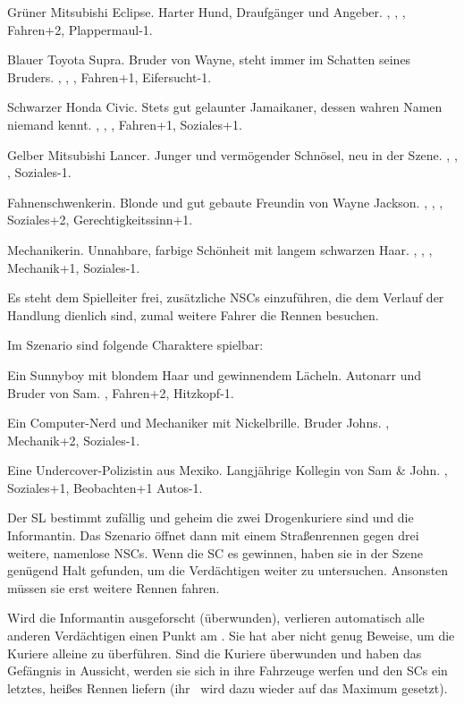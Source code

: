 {		 Grüner Mitsubishi Eclipse. Harter Hund, Draufgänger und Angeber. , , , Fahren+2, Plappermaul-1.

		 Blauer Toyota Supra. Bruder von Wayne, steht immer im Schatten seines Bruders. , , , Fahren+1, Eifersucht-1.

		 Schwarzer Honda Civic. Stets gut gelaunter Jamaikaner, dessen wahren Namen niemand kennt. , , , Fahren+1, Soziales+1.

		 Gelber Mitsubishi Lancer. Junger und vermögender Schnösel, neu in der Szene. , , , Soziales-1.

		 Fahnenschwenkerin. Blonde und gut gebaute Freundin von Wayne Jackson. , , , Soziales+2, Gerechtigkeitssinn+1.

		 Mechanikerin. Unnahbare, farbige Schönheit mit langem schwarzen Haar. , , , Mechanik+1, Soziales-1.

		Es steht dem Spielleiter frei, zusätzliche NSCs einzuführen, die dem Verlauf der Handlung dienlich sind, zumal weitere Fahrer die Rennen besuchen.


		\noindent
		Im Szenario sind folgende Charaktere spielbar:

		 Ein Sunnyboy mit blondem Haar und gewinnendem Lächeln. Autonarr und Bruder von Sam. , Fahren+2, Hitzkopf-1.

		 Ein Computer-Nerd und Mechaniker mit Nickelbrille. Bruder Johns. , Mechanik+2, Soziales-1.

		 Eine Undercover-Polizistin aus Mexiko. Langjährige Kollegin von Sam \& John. , Soziales+1, Beobachten+1 Autos-1.


		\noindent
		Der SL bestimmt zufällig und geheim die zwei Drogenkuriere sind und die Informantin. Das Szenario öffnet dann mit einem Straßenrennen gegen drei weitere, namenlose NSCs. Wenn die SC es gewinnen, haben sie in der Szene genügend Halt gefunden, um die Verdächtigen weiter zu untersuchen. Ansonsten müssen sie erst weitere Rennen fahren.

		Wird die Informantin ausgeforscht (überwunden), verlieren automatisch alle anderen Verdächtigen einen Punkt am \HD. Sie hat aber nicht genug Beweise, um die Kuriere alleine zu überführen. Sind die Kuriere überwunden und haben das Gefängnis in Aussicht, werden sie sich in ihre Fahrzeuge werfen und den SCs ein letztes, heißes Rennen liefern (ihr \HD\ wird dazu wieder auf das Maximum gesetzt).

}
